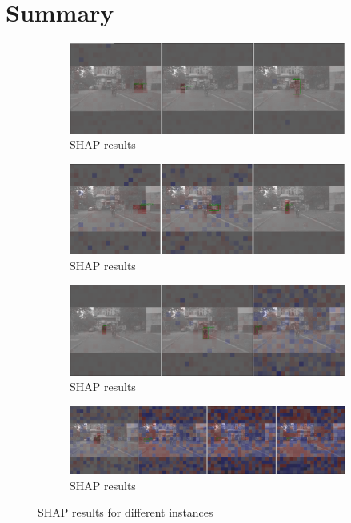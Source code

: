 \section{Summary}\label{sec:results}
\begin{figure}[h!]
    \centering
    \begin{subfigure}[b]{\textwidth}
        \includegraphics[width=\textwidth]{figures/output}
        \caption{SHAP results}\label{fig:SHAP_results2}
    \end{subfigure}
    \hfill
    \begin{subfigure}[b]{\textwidth}
        \includegraphics[width=\textwidth]{figures/output2}
        \caption{SHAP results}\label{fig:SHAP_results20}
    \end{subfigure}
    \hfill
    \begin{subfigure}[b]{\textwidth}
        \includegraphics[width=\textwidth]{figures/output2,1}
        \caption{SHAP results}\label{fig:SHAP_results21}
    \end{subfigure}
    \hfill
    \begin{subfigure}[b]{\textwidth}
        \includegraphics[width=\textwidth]{figures/output2,2}
        \caption{SHAP results}\label{fig:SHAP_results22}
    \end{subfigure}
    \caption{SHAP results for different instances}
    \label{fig:SHAP_results_combined}
\end{figure}
